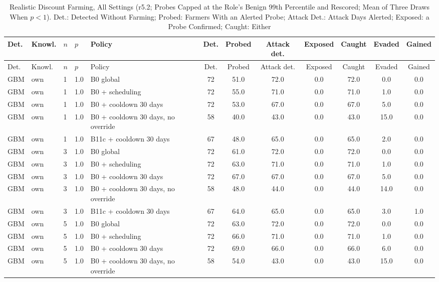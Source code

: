 \begin{longtable}{lllllccccccc}
\caption{Realistic Discount Farming, All Settings (r5.2; Probes Capped at the Role's Benign 99th Percentile and Rescored; Mean of Three Draws When $p<1$). Det.: Detected Without Farming; Probed: Farmers With an Alerted Probe; Attack Det.: Attack Days Alerted; Exposed: a Probe Confirmed; Caught: Either\label{tab:e-l3-r52}}\\
\toprule
Det. & Knowl. & $n$ & $p$ & Policy & Det. & Probed & Attack det. & Exposed & Caught & Evaded & Gained \\
\midrule
\endfirsthead
\toprule
Det. & Knowl. & $n$ & $p$ & Policy & Det. & Probed & Attack det. & Exposed & Caught & Evaded & Gained \\
\midrule
\endhead
GBM & own & 1 & 1.0 & B0 global & 72 & 51.0 & 72.0 & 0.0 & 72.0 & 0.0 & 0.0 \\
GBM & own & 1 & 1.0 & B0 + scheduling & 72 & 55.0 & 71.0 & 0.0 & 71.0 & 1.0 & 0.0 \\
GBM & own & 1 & 1.0 & B0 + cooldown 30 days & 72 & 53.0 & 67.0 & 0.0 & 67.0 & 5.0 & 0.0 \\
GBM & own & 1 & 1.0 & B0 + cooldown 30 days, no override & 58 & 40.0 & 43.0 & 0.0 & 43.0 & 15.0 & 0.0 \\
GBM & own & 1 & 1.0 & B11c + cooldown 30 days & 67 & 48.0 & 65.0 & 0.0 & 65.0 & 2.0 & 0.0 \\
GBM & own & 3 & 1.0 & B0 global & 72 & 61.0 & 72.0 & 0.0 & 72.0 & 0.0 & 0.0 \\
GBM & own & 3 & 1.0 & B0 + scheduling & 72 & 63.0 & 71.0 & 0.0 & 71.0 & 1.0 & 0.0 \\
GBM & own & 3 & 1.0 & B0 + cooldown 30 days & 72 & 67.0 & 67.0 & 0.0 & 67.0 & 5.0 & 0.0 \\
GBM & own & 3 & 1.0 & B0 + cooldown 30 days, no override & 58 & 48.0 & 44.0 & 0.0 & 44.0 & 14.0 & 0.0 \\
GBM & own & 3 & 1.0 & B11c + cooldown 30 days & 67 & 64.0 & 65.0 & 0.0 & 65.0 & 3.0 & 1.0 \\
GBM & own & 5 & 1.0 & B0 global & 72 & 63.0 & 72.0 & 0.0 & 72.0 & 0.0 & 0.0 \\
GBM & own & 5 & 1.0 & B0 + scheduling & 72 & 66.0 & 71.0 & 0.0 & 71.0 & 1.0 & 0.0 \\
GBM & own & 5 & 1.0 & B0 + cooldown 30 days & 72 & 69.0 & 66.0 & 0.0 & 66.0 & 6.0 & 0.0 \\
GBM & own & 5 & 1.0 & B0 + cooldown 30 days, no override & 58 & 54.0 & 43.0 & 0.0 & 43.0 & 15.0 & 0.0 \\

\end{longtable}
